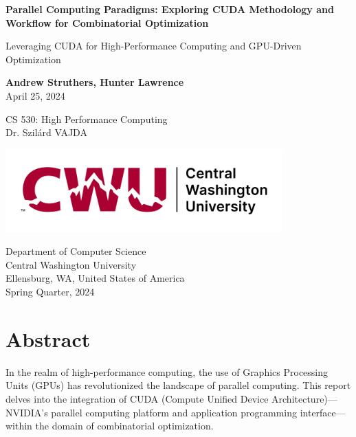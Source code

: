 \documentclass[11pt]{report}
\begin{document}
\begin{titlepage}
   \begin{center}
       \vspace*{1cm}

        {\Huge
       \textbf{Parallel Computing Paradigms: Exploring CUDA Methodology and Workflow for Combinatorial Optimization}

       \vspace{0.5cm}}
        Leveraging CUDA for High-Performance Computing and GPU-Driven Optimization
            
       \vspace{1.5cm}

       \textbf{Andrew Struthers, Hunter Lawrence}\\
       April 25, 2024

       \vfill
            
       CS 530: High Performance Computing\\
       Dr. Szil\'ard VAJDA
            
       \vspace{0.8cm}
       \includegraphics[width=0.8\textwidth]{Images/university_logo}
            
       Department of Computer Science\\
       Central Washington University\\
       Ellensburg, WA, United States of America\\
       Spring Quarter, 2024
            
   \end{center}
\end{titlepage}


\section*{Abstract}
In the realm of high-performance computing, the use of Graphics Processing Units (GPUs) has revolutionized the landscape of parallel computing. This report delves into the integration of CUDA (Compute Unified Device Architecture)—NVIDIA's parallel computing platform and application programming interface—within the domain of combinatorial optimization.
\end{document}
